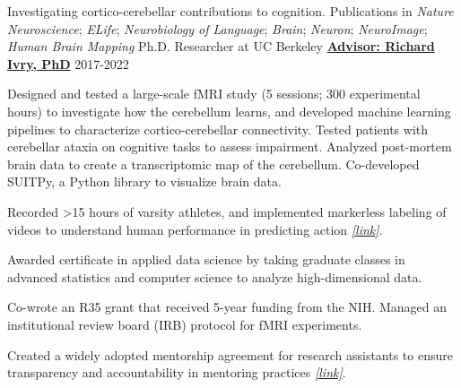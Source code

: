 \begin{cventries}
  \cventry
  	{Investigating cortico-cerebellar contributions to cognition. Publications in \textit{Nature Neuroscience}; \textit{ELife}; \textit{Neurobiology of Language}; \textit{Brain}; \textit{Neuron}; \textit{NeuroImage}; \textit{Human Brain Mapping}}
    {Ph.D. Researcher at UC Berkeley} %
    {\href{https://github.com/maedbhk/}{\textbf{Advisor: Richard Ivry, PhD}}}
    {2017-2022} %
    {
      \begin{cvitems} %
        \item {Designed and tested a large-scale fMRI study (5 sessions; 300 experimental hours) to investigate how the cerebellum learns, and developed machine learning pipelines to characterize cortico-cerebellar connectivity. Tested patients with cerebellar ataxia on cognitive tasks to assess impairment. Analyzed post-mortem brain data to create a transcriptomic map of the cerebellum. Co-developed SUITPy, a Python library to visualize brain data.}
        \item {Recorded >15 hours of varsity athletes, and implemented markerless labeling of videos to understand human performance in predicting action \href{https://github.com/maedbhk/action_prediction}{\textit{[link]}}.}
        \item {Awarded certificate in applied data science by taking graduate classes in advanced statistics and computer science to analyze high-dimensional data.} 
        \item {Co-wrote an R35 grant that received 5-year funding from the NIH. Managed an institutional review board (IRB) protocol for fMRI experiments.}
        \item {Created a widely adopted mentorship agreement for research assistants to ensure transparency and accountability in mentoring practices \href{https://drive.google.com/file/d/1m7PI3lnOZpKdLxWAtxvjcXeQ3xG7I8r0/view?usp=sharing}{\textit{[link]}}.}
      \end{cvitems}
      }
    

\end{cventries}
